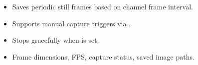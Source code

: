 \documentclass[letterpaper,10pt,english]{sphinxmanual}
\begin{document}
\begin{fulllineitems}
\begin{description}
\begin{itemize}
\item {} 
\sphinxAtStartPar
Saves periodic still frames based on channel frame interval.

\item {} 
\sphinxAtStartPar
Supports manual capture triggers via .

\item {} 
\sphinxAtStartPar
Stops gracefully when  is set.

\end{itemize}

\begin{itemize}
\item {} 
\sphinxAtStartPar
Frame dimensions, FPS, capture status, saved image paths.

\end{itemize}

\end{description}

\end{fulllineitems}

\end{document}
